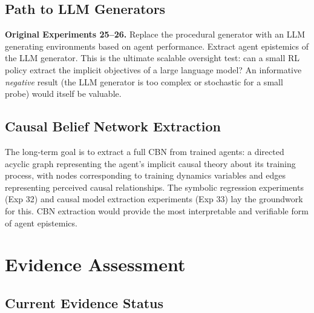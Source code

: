 \documentclass[11pt,a4paper]{article}
\theoremstyle{remark}
\begin{document}
\subsection{Path to LLM Generators}
\textbf{Original Experiments 25--26.} Replace the procedural generator with an LLM generating environments based on agent performance. Extract agent epistemics of the LLM generator. This is the ultimate scalable oversight test: can a small RL policy extract the implicit objectives of a large language model? An informative \textit{negative} result (the LLM generator is too complex or stochastic for a small probe) would itself be valuable.

\subsection{Causal Belief Network Extraction}
The long-term goal is to extract a full CBN from trained agents: a directed acyclic graph representing the agent's implicit causal theory about its training process, with nodes corresponding to training dynamics variables and edges representing perceived causal relationships. The symbolic regression experiments (Exp 32) and causal model extraction experiments (Exp 33) lay the groundwork for this. CBN extraction would provide the most interpretable and verifiable form of agent epistemics.


\section{Evidence Assessment}
\label{sec:evidence}

\subsection{Current Evidence Status}
\end{document}
